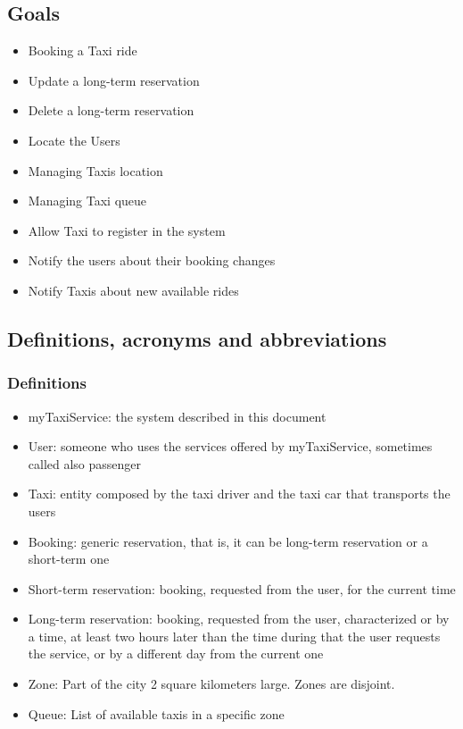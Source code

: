 	\subsection{Goals}
	\begin{itemize}
		\item Booking a Taxi ride
		\item Update a long-term reservation
		\item Delete a long-term reservation
		\item Locate the Users
		\item Managing Taxis location
		\item Managing Taxi queue
		\item Allow Taxi to register in the system
		\item Notify the users about their booking changes
		\item Notify Taxis about new available rides
	\end{itemize}
	
	\subsection{Definitions, acronyms and abbreviations}
		\subsubsection{Definitions}
		\begin{itemize}
			\item myTaxiService: the system described in this document
			\item User: someone who uses the services offered by myTaxiService, sometimes called also passenger
			\item Taxi: entity composed by the taxi driver and the taxi car that transports the users
			\item Booking: generic reservation, that is, it can be long-term reservation or a short-term one
			\item Short-term reservation: booking, requested from the user, for the current time
			\item Long-term reservation: booking, requested from the user, characterized or by a time, at least two hours later than the time during that the user requests the service, or by a different day from the current one
			\item Zone: Part of the city 2 square kilometers large. Zones are disjoint.
			\item Queue: List of available taxis in a specific zone
		\end{itemize}
